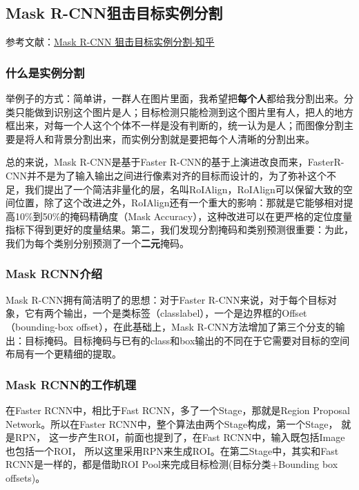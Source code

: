 \subsection{Mask R-CNN狙击目标实例分割}

参考文献：\href{https://zhuanlan.zhihu.com/p/26047813}{Mask R-CNN 狙击目标实例分割-知乎}

\subsubsection{什么是实例分割}

举例子的方式：简单讲，一群人在图片里面，我希望把\textbf{每个人}都给我分割出来。分类只能做到识别这个图片是人；目标检测只能检测到这个图片里有人，把人的地方框出来，对每一个人这个个体不一样是没有判断的，统一认为是人；而图像分割主要是将人和背景分割出来，而实例分割就是要把每个人清晰的分割出来。

总的来说，Mask R-CNN是基于Faster R-CNN的基于上演进改良而来，FasterR-CNN并不是为了输入输出之间进行像素对齐的目标而设计的，为了弥补这个不足，我们提出了一个简洁非量化的层，名叫RoIAlign，RoIAlign可以保留大致的空间位置，除了这个改进之外，RoIAlign还有一个重大的影响：那就是它能够相对提高10\%到50\%的掩码精确度（Mask Accuracy），这种改进可以在更严格的定位度量指标下得到更好的度量结果。第二，我们发现分割掩码和类别预测很重要：为此，我们为每个类别分别预测了一个\textbf{二元}掩码。

\subsubsection{Mask RCNN介绍}
Mask R-CNN拥有简洁明了的思想：对于Faster R-CNN来说，对于每个目标对象，它有两个输出，一个是类标签（classlabel），一个是边界框的Offset（bounding-box offset），在此基础上，Mask R-CNN方法增加了第三个分支的输出：目标掩码。目标掩码与已有的class和box输出的不同在于它需要对目标的空间布局有一个更精细的提取。

\subsubsection{Mask RCNN的工作机理}

在Faster RCNN中，相比于Fast RCNN，多了一个Stage，那就是Region Proposal Network。所以在Faster RCNN中，整个算法由两个Stage构成，第一个Stage， 就是RPN， 这一步产生ROI，前面也提到了，在Fast RCNN中，输入既包括Image也包括一个ROI， 所以这里采用RPN来生成ROI。在第二Stage中，其实和Fast RCNN是一样的，都是借助ROI Pool来完成目标检测(目标分类+Bounding box offsets)。

